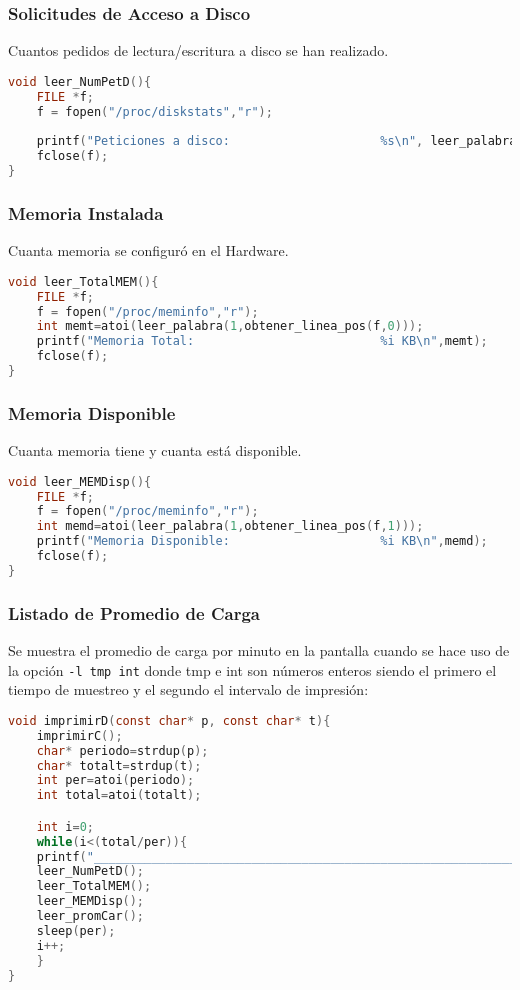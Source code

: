 \documentclass{article}
\begin{document}
\subsubsection*{Solicitudes de Acceso a Disco}
Cuantos pedidos de lectura/escritura a disco se han realizado.
{\fontfamily{\ttdefault}\selectfont
\begin{lstlisting}[language=c,caption=Función leer\_NumPetD()., breaklines=true] 
void leer_NumPetD(){
	FILE *f;
	f = fopen("/proc/diskstats","r");
	
	printf("Peticiones a disco:                     %s\n", leer_palabra(3,obtener_linea_pos(f,nro_linea_con_palabra(f,"sda"))));
	fclose(f);
}
\end{lstlisting}}
\subsubsection*{Memoria Instalada}
Cuanta memoria se configuró en el Hardware.
{\fontfamily{\ttdefault}\selectfont
\begin{lstlisting}[language=c,caption=Función leer\_TotalMEM()., breaklines=true] 
void leer_TotalMEM(){
	FILE *f;
	f = fopen("/proc/meminfo","r");
	int memt=atoi(leer_palabra(1,obtener_linea_pos(f,0)));
	printf("Memoria Total:                          %i KB\n",memt);
	fclose(f);
}
\end{lstlisting}}

\subsubsection*{Memoria Disponible}
Cuanta memoria tiene y cuanta está disponible.
{\fontfamily{\ttdefault}\selectfont
\begin{lstlisting}[language=c,caption=Función leer\_MEMDisp()., breaklines=true] 
void leer_MEMDisp(){
	FILE *f;
	f = fopen("/proc/meminfo","r");
	int memd=atoi(leer_palabra(1,obtener_linea_pos(f,1)));
	printf("Memoria Disponible:                     %i KB\n",memd);
	fclose(f);
}
\end{lstlisting}}

\subsubsection*{Listado de Promedio de Carga}
Se muestra el promedio de carga por minuto en la pantalla cuando se hace uso de la opción \verb+-l tmp int+ donde tmp e int son números enteros siendo el primero el tiempo de muestreo y el segundo el intervalo de impresión:
{\fontfamily{\ttdefault}\selectfont
\begin{lstlisting}[language=c,caption=Función imprimirD()., breaklines=true] 
void imprimirD(const char* p, const char* t){
	imprimirC();
	char* periodo=strdup(p);
	char* totalt=strdup(t);
	int per=atoi(periodo);
	int total=atoi(totalt);

	int i=0;
	while(i<(total/per)){	
	printf("____________________________________________________________\n");
	leer_NumPetD();
	leer_TotalMEM();
	leer_MEMDisp();
	leer_promCar();
	sleep(per);
	i++;
	}
}
\end{lstlisting}}
\end{document}
